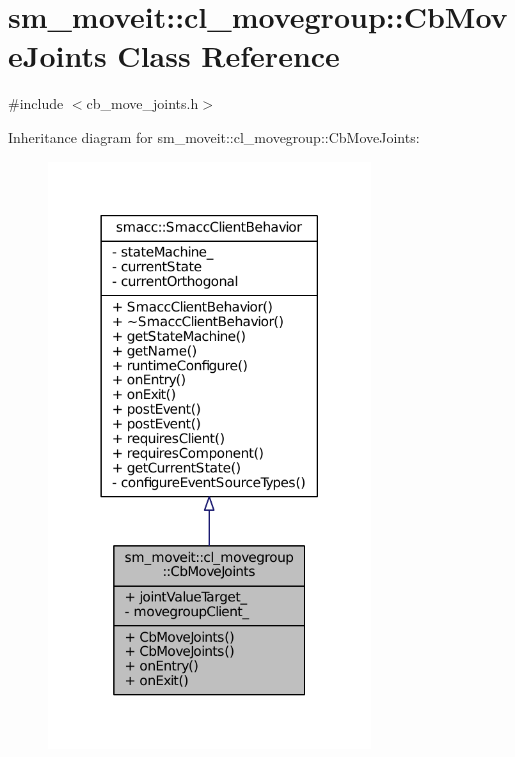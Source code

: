 \hypertarget{classsm__moveit_1_1cl__movegroup_1_1CbMoveJoints}{}\section{sm\+\_\+moveit\+:\+:cl\+\_\+movegroup\+:\+:Cb\+Move\+Joints Class Reference}
\label{classsm__moveit_1_1cl__movegroup_1_1CbMoveJoints}


{\ttfamily \#include $<$cb\+\_\+move\+\_\+joints.\+h$>$}



Inheritance diagram for sm\+\_\+moveit\+:\+:cl\+\_\+movegroup\+:\+:Cb\+Move\+Joints\+:
\nopagebreak
\begin{figure}[H]
\begin{center}
\leavevmode
\includegraphics[width=242pt]{classsm__moveit_1_1cl__movegroup_1_1CbMoveJoints__inherit__graph}
\end{center}
\end{figure}


